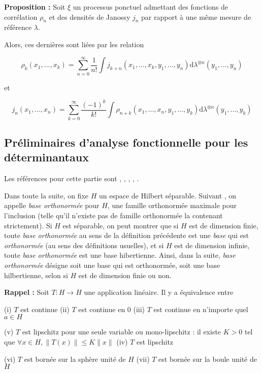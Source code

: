 \documentclass[12pt]{article}
\let\oldsum\sum
\renewcommand{\sum}{\oldsum\limits}
\begin{document}
\textbf{Proposition :} Soit $\xi$ un processus ponctuel admettant des fonctions de corrélation $ \rho_n $ et des densités de Janossy $ j_n $ par rapport à une même mesure de référence $ \lambda $.

Alors, ces dernières sont liées par les relation 

$$ \rho_k(x_1,...,x_k) = \sum_{n=0}^\infty \frac{1}{n!} \int j_{k+n}(x_1,...,x_k,y_1,...,y_n) \mathrm d \lambda^{\otimes n}(y_1,...,y_n) $$

et

$$ j_n(x_1,...,x_n) = \sum_{k=0}^\infty \frac{(-1)^k}{k!} \int \rho_{n+k}(x_1,...,x_n,y_1,...,y_k) \mathrm d \lambda^{\otimes n}(y_1,...,y_k) $$




\subsection{Préliminaires d'analyse fonctionnelle pour les déterminantaux}

Les références pour cette partie sont \cite{ConwayOpTheory2000}, \cite{ConwayFunctAnalysis2019}, \cite{Gohberg2012}, \cite{HawthorneTraceClass2015}, \cite{Meliot2021}.

Dans toute la suite, on fixe $H$ un espace de Hilbert séparable. Suivant \cite{ConwayFunctAnalysis2019}, on appelle \textit{base orthonormée} pour $H$, une famille orthonormée maximale pour l'inclusion (telle qu'il n'existe pas de famille orthonormée la contenant strictement). Si $H$ est séparable, on peut montrer que si $H$ est de dimension finie, toute \textit{base orthonormée} au sens de la définition précédente est une \textit{base} qui est \textit{orthonormée} (au sens des définitions usuelles), et si $H$ est de dimension infinie, toute \textit{base orthonormée} est une base hibertienne. Ainsi, dans la suite, \textit{base orthonormée} désigne soit une base qui est orthonormée, soit une base hilbertienne, selon si $H$ est de dimension finie ou non.

\textbf{Rappel :} Soit $ T : H \to H $ une application linéaire. Il y a équivalence entre

(i) $T$ est continue \quad (ii) $T$ est continue en 0 \quad (iii) $T$ est continue en n'importe quel $a \in H$

(v) $T$ est \og lipschitz pour une seule variable\fg \: ou \og mono-lipschitz \fg \: : il existe $K > 0$ tel que $ \forall x \in H, \|T(x)\| \leqslant K \|x\| $ \qquad \qquad (iv) $T$ est lipschitz

(vi) $T$ est bornée sur la sphère unité de $H$ \quad (vii) $T$ est bornée sur la boule unité de $H$
\end{document}
